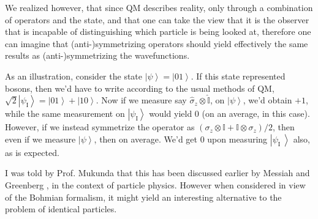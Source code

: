 We realized however, that since QM describes reality, only through
a combination of operators and the state, and that one can take the
view that it is the observer that is incapable of distinguishing which
particle is being looked at, therefore one can imagine that (anti-)symmetrizing
operators should yield effectively the same results as (anti-)symmetrizing
the wavefunctions.

As an illustration, consider the state $\left|\psi\right\rangle =\left|01\right\rangle $.
If this state represented bosons, then we'd have to write according
to the usual methods of QM, $\sqrt{2}\left|\psi_{\text{I}}\right\rangle =\left|01\right\rangle +\left|10\right\rangle $.
Now if we measure say $\hat{\sigma}_{z}\otimes\hat{\mathbb{I}}$,
on $\left|\psi\right\rangle $, we'd obtain $+1$, while the same
measurement on $\left|\psi_{\text{I}}\right\rangle $ would yield
$0$ (on an average, in this case). However, if we instead symmetrize
the operator as $\left(\sigma_{z}\otimes\mathbb{I}+\mathbb{I}\otimes\sigma_{z}\right)/2$,
then even if we measure $\left|\psi\right\rangle $, then on average.
We'd get $0$ upon measuring $\left|\psi_{\text{I }}\right\rangle $
also, as is expected.

I was told by Prof. Mukunda that this has been discussed earlier by
Messiah and Greenberg \cite{symmetrizationIdentical}, in the context
of particle physics. However when considered in view of the Bohmian
formalism, it might yield an interesting alternative to the problem
of identical particles.

